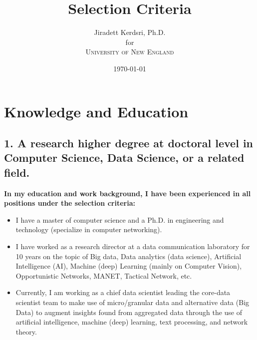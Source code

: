 \documentclass[12pt]{article}
\title{Selection Criteria } %
\author{Jiradett Kerdsri, Ph.D.\\ %
for\\ %
\textsc{University of New England}
}
\date{\today} %
\begin{document}
\setlength{\droptitle}{-5em}    
\maketitle


\section*{Knowledge and Education}

\subsection*{1. A research higher degree at doctoral level in Computer Science, Data Science, or a related field.}
{\bfseries In my education and work background, I have been experienced in all positions under the selection criteria:}

\begin{itemize}
    \item I have a master of computer science and a Ph.D. in engineering and technology (specialize in computer networking).
    \item I have worked as a research director at a data communication laboratory for 10 years on the topic of Big data, Data analytics (data science), Artificial Intelligence (AI), Machine (deep) Learning (mainly on Computer Vision), Opportunistic Networks, MANET, Tactical Network, etc.
    \item Currently, I am working as a chief data scientist leading the core-data scientist team to make use of micro/granular data and alternative data (Big Data) to augment insights found from aggregated data through the use of artificial intelligence, machine (deep) learning, text processing, and network theory.

\end{itemize}
\end{document}
